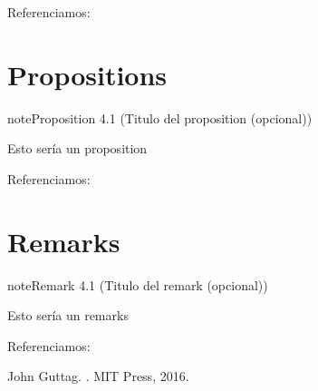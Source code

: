 \documentclass[letterpaper,10pt,english]{jupyterBook}
\begin{document}
\sphinxAtStartPar
Referenciamos: {\hyperref[\detokenize{docs/04_00_Teoremas_pruebas_y_algoritmos:my-property}]{}}


\section{Propositions}
\label{\detokenize{docs/04_00_Teoremas_pruebas_y_algoritmos:propositions}}\label{docs/04_00_Teoremas_pruebas_y_algoritmos:my-proposition}
\begin{sphinxadmonition}{note}{Proposition 4.1 (Titulo del proposition (opcional))}



\sphinxAtStartPar
Esto sería un proposition
\end{sphinxadmonition}

\sphinxAtStartPar
Referenciamos: {\hyperref[\detokenize{docs/04_00_Teoremas_pruebas_y_algoritmos:my-proposition}]{}}


\section{Remarks}
\label{\detokenize{docs/04_00_Teoremas_pruebas_y_algoritmos:remarks}}\label{docs/04_00_Teoremas_pruebas_y_algoritmos:my-remark}
\begin{sphinxadmonition}{note}{Remark 4.1 (Titulo del remark (opcional))}



\sphinxAtStartPar
Esto sería un remarks
\end{sphinxadmonition}

\sphinxAtStartPar
Referenciamos: {\hyperref[\detokenize{docs/04_00_Teoremas_pruebas_y_algoritmos:my-remark}]{}}

\begin{sphinxthebibliography}{1}
\sphinxAtStartPar
John Guttag. . MIT Press, 2016.
\end{sphinxthebibliography}
\end{document}

